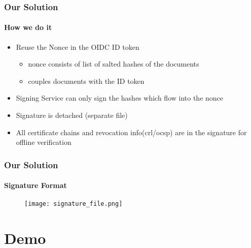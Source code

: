 \begin{frame}[t]\frametitle{Our Solution}
	\framesubtitle{How we do it}
	\begin{itemize}
		\item Reuse the Nonce in the OIDC ID token
		\begin{itemize}
			\item nonce consists of list of salted hashes of the documents
			\item couples documents with the ID token
		\end{itemize}
		\item Signing Service can only sign the hashes which flow into the nonce
		\item Signature is detached (separate file)
		\item All certificate chains and revocation info(crl/ocsp) are in the signature for offline verification
	\end{itemize}
\end{frame}

\begin{frame}[t]\frametitle{Our Solution}
	\framesubtitle{Signature Format}
	\begin{figure}[ht]
		\centering
		\texttt{[image: signature\_file.png]}
	\end{figure}
\end{frame}

\section{Demo}
\sectionpage
